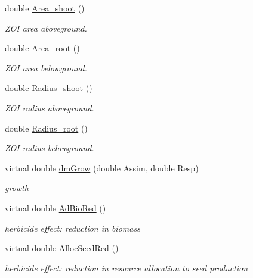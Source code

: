 \begin{DoxyCompactItemize}
double \mbox{\hyperlink{class_c_plant_a45e9f6a89368ab3ac990471ebf2bf6a1}{Area\+\_\+shoot}} ()
\begin{DoxyCompactList}\small\item\em Z\+OI area aboveground. \end{DoxyCompactList}\item 
double \mbox{\hyperlink{class_c_plant_a9cc752efa2b7d548f47bba881be6e764}{Area\+\_\+root}} ()
\begin{DoxyCompactList}\small\item\em Z\+OI area belowground. \end{DoxyCompactList}\item 
double \mbox{\hyperlink{class_c_plant_a9a3ec11bb76d2264c31d0e0154df03a8}{Radius\+\_\+shoot}} ()
\begin{DoxyCompactList}\small\item\em Z\+OI radius aboveground. \end{DoxyCompactList}\item 
double \mbox{\hyperlink{class_c_plant_a865e74078ea231ec3e4b9396f50bff61}{Radius\+\_\+root}} ()
\begin{DoxyCompactList}\small\item\em Z\+OI radius belowground. \end{DoxyCompactList}\item 
virtual double \mbox{\hyperlink{class_c_plant_af0b2cca25cc5a0a623d344a2c48ac73a}{dm\+Grow}} (double Assim, double Resp)
\begin{DoxyCompactList}\small\item\em growth \end{DoxyCompactList}\item 
\mbox{\label{class_c_plant_a89014f14d398abf7965cbe3c3231a742}} 
virtual double \mbox{\hyperlink{class_c_plant_a89014f14d398abf7965cbe3c3231a742}{Ad\+Bio\+Red}} ()
\begin{DoxyCompactList}\small\item\em herbicide effect\+: reduction in biomass \end{DoxyCompactList}\item 
\mbox{\label{class_c_plant_a7ff3db7c0854b2d92269bf48e3925ec0}} 
virtual double \mbox{\hyperlink{class_c_plant_a7ff3db7c0854b2d92269bf48e3925ec0}{Alloc\+Seed\+Red}} ()
\begin{DoxyCompactList}\small\item\em herbicide effect\+: reduction in resource allocation to seed production \end{DoxyCompactList}\item 

\end{DoxyCompactItemize}
